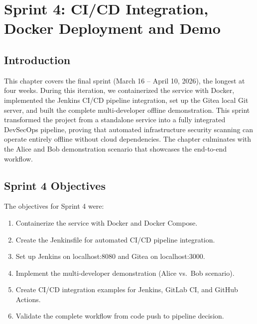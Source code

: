 
\chapter{Sprint 4: CI/CD Integration, Docker Deployment and Demo}

\section{Introduction}

This chapter covers the final sprint (March 16 -- April 10, 2026), the longest at four weeks. During this iteration, we containerized the service with Docker, implemented the Jenkins CI/CD pipeline integration, set up the Gitea local Git server, and built the complete multi-developer offline demonstration. This sprint transformed the project from a standalone service into a fully integrated DevSecOps pipeline, proving that automated infrastructure security scanning can operate entirely offline without cloud dependencies. The chapter culminates with the Alice and Bob demonstration scenario that showcases the end-to-end workflow.

\section{Sprint 4 Objectives}

The objectives for Sprint 4 were:

\begin{enumerate}
    \item Containerize the service with Docker and Docker Compose.
    \item Create the Jenkinsfile for automated CI/CD pipeline integration.
    \item Set up Jenkins on localhost:8080 and Gitea on localhost:3000.
    \item Implement the multi-developer demonstration (Alice vs.\ Bob scenario).
    \item Create CI/CD integration examples for Jenkins, GitLab CI, and GitHub Actions.
    \item Validate the complete workflow from code push to pipeline decision.
\end{enumerate}

